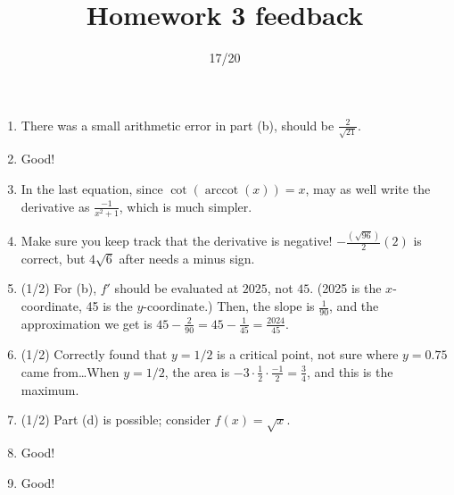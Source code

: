 \documentclass{article}
\title{Homework 3 feedback}
\author{}
\date{17/20}
\begin{document}
\maketitle
\begin{enumerate}
	\item There was a small arithmetic error in part (b), should be $\frac{2}{\sqrt{21}}$.
	\item Good!
	\item In the last equation, since $\cot(\operatorname{arccot}(x)) = x$, may as well write the derivative as $\frac{-1}{x^{2} + 1}$, which is much simpler.
	\item Make sure you keep track that the derivative is negative! $- \frac{(\sqrt{96})}{2} (2)$ is correct, but $4 \sqrt{6}$ after needs a minus sign.
	\item (1/2) For (b), $f'$ should be evaluated at $2025$, not $45$. (2025 is the $x$-coordinate, 45 is the $y$-coordinate.) Then, the slope is $\frac{1}{90}$, and the approximation we get is $45 - \frac{2}{90} = 45 - \frac{1}{45} = \frac{2024}{45}$.
	\item (1/2) Correctly found that $y = 1/2$ is a critical point, not sure where $y=0.75$ came from\ldots When $y=1/2$, the area is $-3 \cdot \frac{1}{2} \cdot \frac{-1}{2} = \frac{3}{4}$, and this is the maximum.
	\item (1/2) Part (d) is possible; consider $f(x) = \sqrt{x}$.
	\item Good!
	\item Good!
\end{enumerate}
\end{document}
